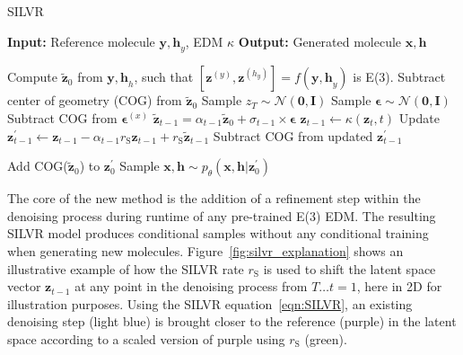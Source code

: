 \documentclass[journal=jacsat,manuscript=article]{achemso}
\begin{document}
\begin{algorithm}
\caption{SILVR}\label{alg:silvr}
\begin{algorithmic}[1]
\State \textbf{Input:} Reference molecule $\mathbf{y,h}_y$, EDM $\kappa$ 
\State \textbf{Output:} Generated molecule $\mathbf{x,h}$

\State Compute $\mathbf{\tilde{z}}_0$ from $\mathbf{y, h}_h$, such that $[\mathbf{z}^{(y)} , \mathbf{z}^{(h_y)} ] = f (\mathbf{y, h}_y)$ is E(3). 
\State Subtract center of geometry (COG) from $\mathbf{\tilde{z}}_0$
\State Sample $z_T \sim \mathcal{N}(\mathbf{0,I})$
    \State Sample $\boldsymbol{\epsilon} \sim \mathcal{N}(\mathbf{0,I})$
    \State Subtract COG from $\boldsymbol{\epsilon}^{(x)}$
    \State $\mathbf{\tilde{z}}_{t-1} = \alpha_{t-1} \mathbf{\tilde{z}}_{0} +\sigma_{t-1}\times\boldsymbol{\epsilon}$
    \State $\mathbf{z}_{t-1} \gets \kappa (\mathbf{z}_t,t)$
    \State Update $\mathbf{z}^{\prime}_{t-1} \gets \mathbf{z}_{t-1} - \alpha_{t-1}r_{\mathrm{S}} \mathbf{z}_{t-1} +r_{\mathrm{S}} \mathbf{\tilde{z}}_{t-1}$ 
    \State Subtract COG from updated $\mathbf{z}^{\prime}_{t-1}$

\EndFor
\State Add COG($\mathbf{\tilde{z}}_0$) to $\mathbf{z}^{\prime}_0$
\State Sample $\mathbf{x,h} \sim p_{\theta}(\mathbf{x,h}|\mathbf{z}^{\prime}_0)$ 
\end{algorithmic}
\end{algorithm}



The core of the new method is the addition of a refinement step within the denoising process during runtime of any pre-trained E(3) EDM. The resulting SILVR model produces conditional samples without any conditional training when generating new molecules. Figure~\ref{fig:silvr_explanation} shows an illustrative example of how the SILVR rate $r_{\mathrm{S}}$ is used to shift the latent space vector $\mathbf{z}_{t-1}$ at any point in the denoising process from $T\ldots t=1$, here in 2D for illustration purposes. Using the SILVR equation~\ref{eqn:SILVR}, an existing denoising step (light blue) is brought closer to the reference (purple) in the latent space according to a scaled version of purple using $r_{\mathrm{S}}$ (green).
\end{document}
